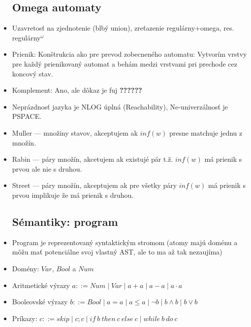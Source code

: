 \documentclass[paper=a4, fontsize=11pt]{scrartcl} %
\numberwithin{equation}{section} %
\numberwithin{figure}{section} %
\numberwithin{table}{section} %
\begin{document}
\begin{itemize}
	\subsection{Omega automaty}
	
	\item Uzavretosť na zjednotenie (blbý union), zreťazenie regulárny+omega, res. regulárny$^\omega$
	
	\item Prienik: Konštrukcia ako pre prevod zobecneného automatu: Vytvorím vrstvy pre každý prienikovaný automat a behám medzi vrstvami pri prechode cez koncový stav.
	
	\item Komplement: Ano, ale dôkaz je fuj \textbf{??????} 
	
	\item Neprázdnosť jazyka je NLOG úplná (Reachability), Ne-univerzálnosť je PSPACE.
	
	\item Muller — množiny stavov, akceptujem ak $inf(w)$ presne matchuje jednu z množín.
	
	\item Rabin — páry množín, akcetujem ak existujé pár t.ž. $inf(w)$ má prienik s prvou ale nie s druhou.
	
	\item Street — páry množín, akceptujem ak pre všetky páry $inf(w)$ má prienik s prvou implikuje že má prienik s druhou.
	
	\subsection{Sémantiky: program}
	
	\item Program je reprezentovaný syntaktickým stromom (atomy majú doménu a môžu mať potenciálne svoj vlastný AST, ale to ma až tak nezaujíma)
	
	\item Domény: $Var$, $Bool$ a $Num$ 
	
	\item Aritmetické výrazy $a ::= Num \mid Var \mid a + a \mid a - a \mid a \cdot a$
	
	\item Booleovské výrazy $b ::= Bool \mid a = a \mid a \leq a \mid \neg b \mid b \land b \mid b \lor b$
	
	\item Príkazy: $c ::= skip \mid c;c \mid if\ b\ then\ c\ else\ c \mid while\ b\ do\ c$
	

\end{itemize}
\end{document}
